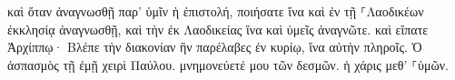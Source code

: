 \documentclass{openreader}
\begin{document}
καὶ ὅταν ἀναγνωσθῇ παρ’ ὑμῖν ἡ ἐπιστολή, ποιήσατε ἵνα καὶ ἐν τῇ ⸀Λαοδικέων ἐκκλησίᾳ ἀναγνωσθῇ, καὶ τὴν ἐκ Λαοδικείας ἵνα καὶ ὑμεῖς ἀναγνῶτε. 
καὶ εἴπατε Ἀρχίππῳ· Βλέπε τὴν διακονίαν ἣν παρέλαβες ἐν κυρίῳ, ἵνα αὐτὴν πληροῖς. 
Ὁ ἀσπασμὸς τῇ ἐμῇ χειρὶ Παύλου. μνημονεύετέ μου τῶν δεσμῶν. ἡ χάρις μεθ’ ⸀ὑμῶν. 
\end{document}
